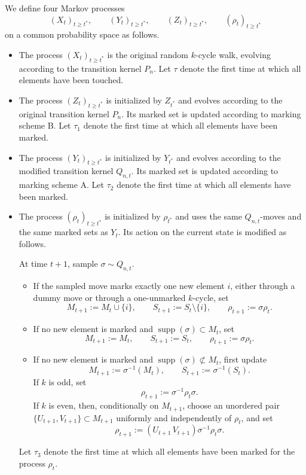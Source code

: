 \begin{defi}
We define four Markov processes
$$
(X_t)_{t\ge t^*},\qquad
(Y_t)_{t\ge t^*},\qquad
(Z_t)_{t\ge t^*},\qquad
(\rho_t)_{t\ge t^*}
$$
on a common probability space as follows.
\begin{itemize}
\item The process $(X_t)_{t\ge t^*}$ is the original random $k$-cycle walk,
evolving according to the transition kernel $P_n$. Let $\tau$ denote
the first time at which all elements have been touched.

\item The process $(Z_t)_{t\ge t^*}$ is initialized by $Z_{t^*}$ and evolves
according to the original transition kernel $P_n$. Its marked set is
updated according to marking scheme B. Let $\tau_1$ denote the first time at
which all elements have been marked.

\item The process $(Y_t)_{t\ge t^*}$ is initialized by $Y_{t^*}$ and evolves
according to the modified transition kernel $Q_{n,t}$. Its marked set is
updated according to marking scheme A. Let $\tau_2$ denote the first time at
which all elements have been marked.

\item The process $(\rho_t)_{t\ge t^*}$ is initialized by $\rho_{t^*}$ and
uses the same $Q_{n,t}$-moves and the same marked sets as $Y_t$. Its action
on the current state is modified as follows.

At time $t+1$, sample $\sigma\sim Q_{n,t}$.

\begin{itemize}
    \item If the sampled move marks exactly one new element $i$, either through
    a dummy move or through a one-unmarked $k$-cycle, set
    $$
      M_{t+1}:=M_t \cup \{i\},
        \qquad
        S_{t+1}:=S_t \setminus \{i\}, \qquad  \rho_{t+1}:=\sigma\rho_t.
    $$

    \item If no new element is marked and
    $\operatorname{supp}(\sigma)\subset M_t$, set
    $$
       M_{t+1}:=M_t,
        \qquad
        S_{t+1}:=S_t, \qquad  \rho_{t+1}:=\sigma\rho_t.
    $$

    \item If no new element is marked and
    $\operatorname{supp}(\sigma)\not\subset M_t$, first update
    $$
        M_{t+1}:=\sigma^{-1}(M_t),
        \qquad
        S_{t+1}:=\sigma^{-1}(S_t).
    $$
    If $k$ is odd, set
    $$
        \rho_{t+1}:=\sigma^{-1}\rho_t\sigma.
    $$
    If $k$ is even, then, conditionally on $M_{t+1}$, choose an unordered pair
    $\{U_{t+1},V_{t+1}\}\subset M_{t+1}$ uniformly and independently of
    $\rho_t$, and set
    $$
        \rho_{t+1}:=(U_{t+1}\,V_{t+1})\sigma^{-1}\rho_t\sigma.
    $$
\end{itemize}
Let $\tau_3$ denote the first time at which all elements have been marked
for the process $\rho_t$.

\end{itemize}
\end{defi}


